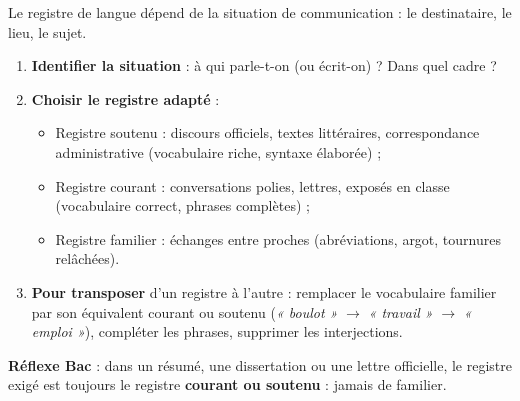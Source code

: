 \documentclass[11pt]{article}
\newcommand{\cle}[1]{{\popxbold\color{popdark}#1}}
\begin{document}
\begin{methode}
Le \cle{registre de langue} dépend de la situation de communication : le destinataire, le lieu, le sujet.
\begin{enumerate}
\item \textbf{Identifier la situation} : à qui parle-t-on (ou écrit-on) ? Dans quel cadre ?
\item \textbf{Choisir le registre adapté} :
\begin{itemize}
\item \cle{Registre soutenu} : discours officiels, textes littéraires, correspondance administrative (vocabulaire riche, syntaxe élaborée) ;
\item \cle{Registre courant} : conversations polies, lettres, exposés en classe (vocabulaire correct, phrases complètes) ;
\item \cle{Registre familier} : échanges entre proches (abréviations, argot, tournures relâchées).
\end{itemize}
\item \textbf{Pour transposer} d'un registre à l'autre : remplacer le vocabulaire familier par son équivalent courant ou soutenu (\emph{« boulot »} $\rightarrow$ \emph{« travail »} $\rightarrow$ \emph{« emploi »}), compléter les phrases, supprimer les interjections.
\end{enumerate}
\textbf{Réflexe Bac} : dans un résumé, une dissertation ou une lettre officielle, le registre exigé est toujours le registre \textbf{courant ou soutenu} : jamais de familier.
\end{methode}
\end{document}
